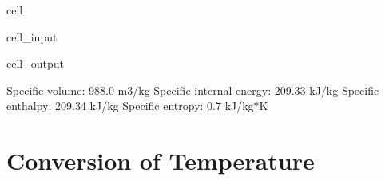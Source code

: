 \documentclass[letterpaper,10pt,english]{jupyterBook}
\begin{document}
\begin{sphinxuseclass}{cell}
\begin{sphinxVerbatimInput}
\begin{sphinxuseclass}{cell_input}
\begin{sphinxVerbatim}[commandchars=\\\{\}]
\end{sphinxVerbatim}

\end{sphinxuseclass}\end{sphinxVerbatimInput}
\begin{sphinxVerbatimOutput}

\begin{sphinxuseclass}{cell_output}
\begin{sphinxVerbatim}[commandchars=\\\{\}]
Specific volume: 988.0 m\PYGZca{}3/kg
Specific internal energy: 209.33 kJ/kg
Specific enthalpy: 209.34 kJ/kg
Specific entropy: 0.7 kJ/kg*K
\end{sphinxVerbatim}

\end{sphinxuseclass}\end{sphinxVerbatimOutput}

\end{sphinxuseclass}
\sphinxstepscope


\section{Conversion of Temperature}
\label{\detokenize{notebooks/Chapter2/Problem_7_Conversion_of_Temperature:conversion-of-temperature}}\label{\detokenize{notebooks/Chapter2/Problem_7_Conversion_of_Temperature::doc}}
\end{document}
